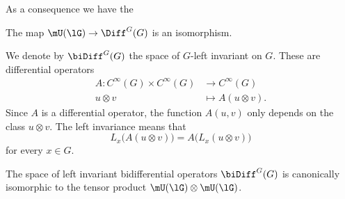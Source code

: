 As a consequence we have the
\begin{corollary}	\label{CorUisomDiff}
	The map $\mU(\lG)\to\Diff^G(G)$ is an isomorphism.
\end{corollary}

We denote by $\biDiff^G(G)$ the space of $G$-left invariant  on $G$. These are differential operators
\begin{equation}
	\begin{aligned}
		A\colon  C^{\infty}(G)\times C^{\infty}(G)&\to  C^{\infty}(G) \\
		u\otimes v&\mapsto A(u\otimes v). 
	\end{aligned}
\end{equation}
Since $A$ is a differential operator, the function $A(u,v)$ only depends on the class $u\otimes v$. The left invariance means that
\begin{equation}		\label{EqDefLeftInvarbiDiff}
	L_x\big( A(u\otimes v) \big)=A\big( L_x(u\otimes v) \big)
\end{equation}
for every $x\in G$.

\begin{proposition}		\label{PropbidiffUU}
	The space of left invariant bidifferential operators $\biDiff^G(G)$ is canonically isomorphic to the tensor product $\mU(\lG)\otimes\mU(\lG)$.
\end{proposition}

